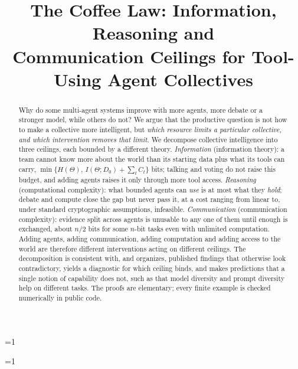\documentclass[conference]{IEEEtran}
\providecommand{\PaperAnon}{0}   %
\providecommand{\PaperFinal}{0}  %
\theoremstyle{definition}
\newcommand{\I}{I}
\newcommand{\Hh}{H}
\begin{document}
\title{The Coffee Law: Information, Reasoning and\\Communication Ceilings for Tool-Using Agent Collectives}

\ifnum\PaperAnon=1
\author{}
\else
\author{
}
\fi

\ifnum\PaperFinal=1
\fi
\maketitle

\begin{abstract}
Why do some multi-agent systems improve with more agents, more debate or a
stronger model, while others do not? We argue that the productive question is
not how to make a collective more intelligent, but \emph{which resource limits a
particular collective, and which intervention removes that limit}. We decompose
collective intelligence into three ceilings, each bounded by a different theory.
\emph{Information} (information theory): a team cannot know more about the world
than its starting data plus what its tools can carry,
$\min\{\Hh(\Theta),\,\I(\Theta;D_0)+\sum_t C_t\}$ bits; talking and voting do not
raise this budget, and adding agents raises it only through more tool access. \emph{Reasoning} (computational complexity):
what bounded agents can \emph{use} is at most what they \emph{hold}; debate and
compute close the gap but never pass it, at a cost ranging from linear to,
under standard cryptographic assumptions, infeasible. \emph{Communication} (communication complexity): evidence split across
agents is unusable to any one of them until enough is exchanged, about $n/2$ bits
for some $n$-bit tasks even with unlimited computation. Adding agents, adding
communication, adding computation and adding access to the world are therefore
different interventions acting on different ceilings. The decomposition is consistent
with, and organizes, published findings that otherwise look contradictory, yields a diagnostic for
which ceiling binds, and makes predictions that a single notion of capability
does not, such as that model diversity and prompt diversity help on different
tasks. The proofs are elementary; every finite example is checked numerically in public code.
\end{abstract}
\end{document}
